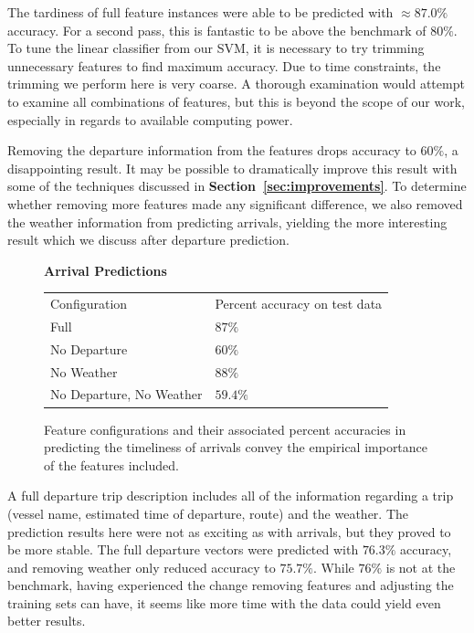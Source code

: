 \documentclass[11pt]{article} %
\begin{document}
The tardiness of full feature instances were able to be predicted with 
$\approx 87.0\%$ accuracy. For a second pass, this is fantastic to be above the
benchmark of $80\%$. To tune the linear classifier from our SVM, it is necessary
to try trimming unnecessary features to find maximum accuracy. Due to time 
constraints, the trimming we perform here is very coarse. A thorough examination
would attempt to examine all combinations of features, but this is beyond the
scope of our work, especially in regards to available computing power.

Removing the departure information from the features drops accuracy to $60\%$, 
a disappointing result. It may be possible to dramatically improve this result with
some of the techniques discussed in \textbf{Section~\ref{sec:improvements}}. 
To determine whether removing more features made any significant difference, we
also removed the weather information from predicting arrivals, yielding 
the more interesting result which we discuss after departure prediction.

\begin{figure}
    \centering
    \textbf{Arrival Predictions}

    \begin{tabular}{ll}
        Configuration & Percent accuracy on test data\\
        Full          & $87\%$\\
        No Departure  & $60\%$\\
        No Weather    & $88\%$\\
        No Departure, No Weather  & $59.4\%$\\
    \end{tabular}
    \caption{Feature configurations and their associated percent accuracies in
         predicting the timeliness of arrivals convey the empirical importance of 
         the features included.}
    \label{fig:second_run_data_arrivals}
\end{figure}


A full departure trip description includes all of the information regarding a trip
(vessel name, estimated time of departure, route) and the weather. 
The prediction results here were not
as exciting as with arrivals, but they proved to be more stable. The full 
departure vectors were predicted with $76.3\%$ accuracy, and removing weather
only reduced accuracy to $75.7\%$. While $76\%$ is not at the benchmark, having
experienced the change removing features and adjusting the training sets can have,
it seems like more time with the data could yield even better results.
\end{document}
